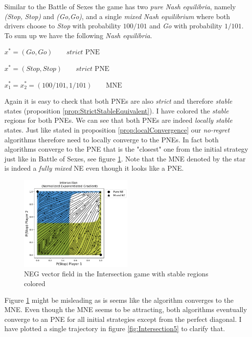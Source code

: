 Similar to the Battle of Sexes the game has two \textit{pure Nash equilibria}, namely \textit{(Stop, Stop)} and \textit{(Go,Go)}, and a single \textit{mixed Nash equilibrium} where both drivers choose to \textit{Stop} with probability $100/101$ and \textit{Go} with probability $1/101$. To sum up we have the following \textit{Nash equilibria}.

\begin{description}\centering
    \item $x^{*} = (Go,Go) \qquad \textit{strict }\text{PNE}$
    \item $x^{*} = (Stop,Stop) \qquad \textit{strict }\text{PNE}$
    \item $x_{1}^* = x_{2}^* = (100/101,1/101) \qquad \text{MNE}$
\end{description}

Again it is easy to check that both PNEs are also \textit{strict} and therefore \textit{stable} states (proposition \ref{prop:StrictStableEquivalent}). I have colored the \textit{stable} regions for both PNEs. We can see that both PNEs are indeed \textit{locally stable} states. Just like stated in proposition \ref{prop:localConvergence} our \textit{no-regret} algorithms therefore need to locally converge to the PNEs. In fact both algorithms converge to the PNE that is the "closest" one from the initial strategy just like in Battle of Sexes, see figure \ref{fig:Intersection4}. Note that the MNE denoted by the star is indeed a \textit{fully mixed} NE even though it looks like a PNE.

\begin{figure}[H]
    \centering
    \includegraphics[width=0.5\textwidth]{logos/Intersection4.png}
    \caption{NEG vector field in the Intersection game with stable regions colored}
    \label{fig:Intersection4}
\end{figure}

Figure \ref{fig:Intersection4} might be misleading as is seems like the algorithm converges to the MNE. Even though the MNE seems to be attracting, both algorithms eventually converge to an PNE for all initial strategies except from the perfect diagonal. I have plotted a single trajectory in figure \ref{fig:Intersection5} to clarify that. 

